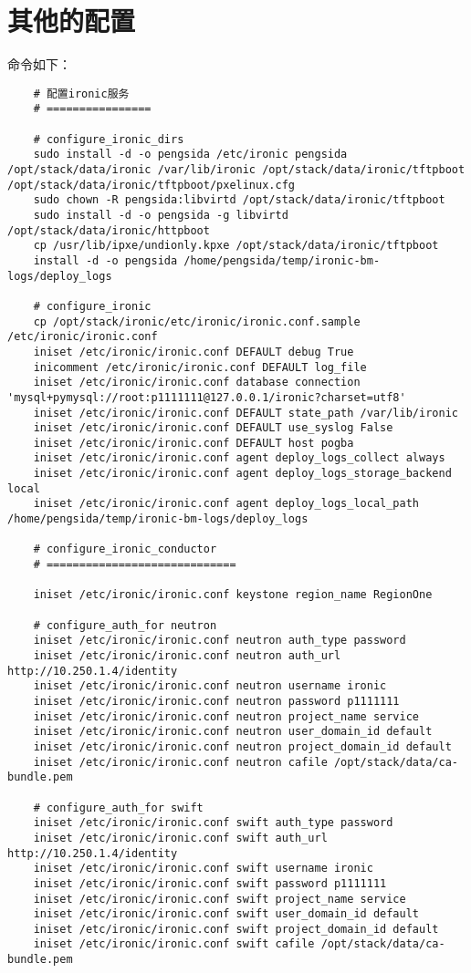 \documentclass[a4paper,left=1.5cm,right=1.5cm,11pt]{article}
\begin{document}
\section{其他的配置}
	命令如下：
	\begin{lstlisting}
	# 配置ironic服务
	# ================

	# configure_ironic_dirs
	sudo install -d -o pengsida /etc/ironic pengsida /opt/stack/data/ironic /var/lib/ironic /opt/stack/data/ironic/tftpboot /opt/stack/data/ironic/tftpboot/pxelinux.cfg
	sudo chown -R pengsida:libvirtd /opt/stack/data/ironic/tftpboot
	sudo install -d -o pengsida -g libvirtd /opt/stack/data/ironic/httpboot
	cp /usr/lib/ipxe/undionly.kpxe /opt/stack/data/ironic/tftpboot
	install -d -o pengsida /home/pengsida/temp/ironic-bm-logs/deploy_logs

	# configure_ironic
	cp /opt/stack/ironic/etc/ironic/ironic.conf.sample /etc/ironic/ironic.conf
	iniset /etc/ironic/ironic.conf DEFAULT debug True
	inicomment /etc/ironic/ironic.conf DEFAULT log_file
	iniset /etc/ironic/ironic.conf database connection 'mysql+pymysql://root:p1111111@127.0.0.1/ironic?charset=utf8'
	iniset /etc/ironic/ironic.conf DEFAULT state_path /var/lib/ironic
	iniset /etc/ironic/ironic.conf DEFAULT use_syslog False
	iniset /etc/ironic/ironic.conf DEFAULT host pogba
	iniset /etc/ironic/ironic.conf agent deploy_logs_collect always
	iniset /etc/ironic/ironic.conf agent deploy_logs_storage_backend local
	iniset /etc/ironic/ironic.conf agent deploy_logs_local_path /home/pengsida/temp/ironic-bm-logs/deploy_logs

	# configure_ironic_conductor
	# =============================

	iniset /etc/ironic/ironic.conf keystone region_name RegionOne

	# configure_auth_for neutron
	iniset /etc/ironic/ironic.conf neutron auth_type password
	iniset /etc/ironic/ironic.conf neutron auth_url http://10.250.1.4/identity
	iniset /etc/ironic/ironic.conf neutron username ironic
	iniset /etc/ironic/ironic.conf neutron password p1111111
	iniset /etc/ironic/ironic.conf neutron project_name service
	iniset /etc/ironic/ironic.conf neutron user_domain_id default
	iniset /etc/ironic/ironic.conf neutron project_domain_id default
	iniset /etc/ironic/ironic.conf neutron cafile /opt/stack/data/ca-bundle.pem

	# configure_auth_for swift
	iniset /etc/ironic/ironic.conf swift auth_type password
	iniset /etc/ironic/ironic.conf swift auth_url http://10.250.1.4/identity
	iniset /etc/ironic/ironic.conf swift username ironic
	iniset /etc/ironic/ironic.conf swift password p1111111
	iniset /etc/ironic/ironic.conf swift project_name service
	iniset /etc/ironic/ironic.conf swift user_domain_id default
	iniset /etc/ironic/ironic.conf swift project_domain_id default
	iniset /etc/ironic/ironic.conf swift cafile /opt/stack/data/ca-bundle.pem


\end{lstlisting}
\end{document}
